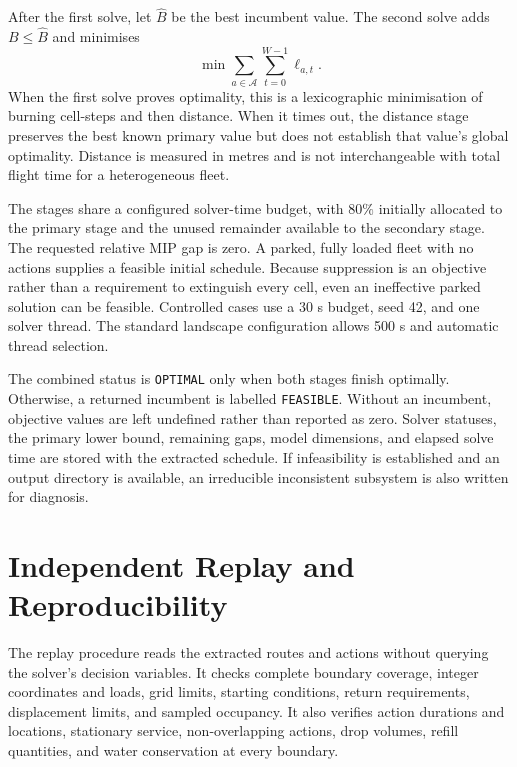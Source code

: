 After the first solve, let $\widehat B$ be the best incumbent value. The second solve adds $B\leq\widehat B$ and minimises
\begin{equation}
    \min\sum_{a\in\mathcal{A}}\sum_{t=0}^{W-1}\ell_{a,t}.
    \label{eq:static-secondary}
\end{equation}
When the first solve proves optimality, this is a lexicographic minimisation of burning cell-steps and then distance. When it times out, the distance stage preserves the best known primary value but does not establish that value's global optimality. Distance is measured in metres and is not interchangeable with total flight time for a heterogeneous fleet.

The stages share a configured solver-time budget, with $80\%$ initially allocated to the primary stage and the unused remainder available to the secondary stage. The requested relative MIP gap is zero. A parked, fully loaded fleet with no actions supplies a feasible initial schedule. Because suppression is an objective rather than a requirement to extinguish every cell, even an ineffective parked solution can be feasible. Controlled cases use a 30 s budget, seed 42, and one solver thread. The standard landscape configuration allows 500 s and automatic thread selection.

The combined status is \texttt{OPTIMAL} only when both stages finish optimally. Otherwise, a returned incumbent is labelled \texttt{FEASIBLE}. Without an incumbent, objective values are left undefined rather than reported as zero. Solver statuses, the primary lower bound, remaining gaps, model dimensions, and elapsed solve time are stored with the extracted schedule. If infeasibility is established and an output directory is available, an irreducible inconsistent subsystem is also written for diagnosis.

\section{Independent Replay and Reproducibility}
\label{sec:method-replay}

The replay procedure reads the extracted routes and actions without querying the solver's decision variables. It checks complete boundary coverage, integer coordinates and loads, grid limits, starting conditions, return requirements, displacement limits, and sampled occupancy. It also verifies action durations and locations, stationary service, non-overlapping actions, drop volumes, refill quantities, and water conservation at every boundary.

